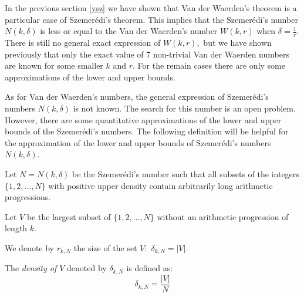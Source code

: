 In the previous section \eqref{vsz} we have shown that Van der Waerden's theorem is a particular case of Szemerédi's theorem. This implies that the Szemerédi's number $N(k, \delta)$ is less or equal to the Van der Waerden's number $W(k,r)$ when $\delta=\frac{1}{r}.$
There is still no  general exact expression of $W(k,r),$ but  we have shown previously that only the exact value of 7 non-trivial Van der Waerden numbers are known for some smaller $k$ and $r$. For the remain cases there are only some  approximations of the lower and upper bounds. 

As for Van der Waerden's numbers,  the general expression of Szemerédi's numbers $N(k, \delta)$ is not known. The search for this number is an open problem. However, there are some quantitative approximations of the lower and upper bounds of the Szemerédi's numbers.  The following definition will be helpful for the approximation of the lower and upper bounds of Szemerédi's numbers $N(k, \delta)$.

\begin{defn} Let $N=N(k, \delta)$ be the Szemerédi's number such that all subsets of the integers $\{1,2,\ldots,N\}$ with positive upper density contain arbitrarily long arithmetic progressions.

Let $V$ be the largest subset of $\{1,2,\ldots, N \}$ without an arithmetic progression of length $k.$

We denote by $r_{k,N}$ the size of the set $V:$ $\delta_{k,N}= |V|.$

The \textit{density of $V$} denoted by $\delta_{k,N}$ is defined as: $$\delta_{k,N}=\frac{|V|}{N}$$

\end{defn}


